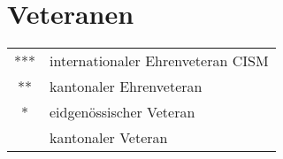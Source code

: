 \begin{history}
    \unvbox\mitgliederbox
\end{history}

\chapter{Veteranen}
\begin{history}
    \unvbox\veteranenbox
\end{history}

\begin{tabular}{ c l  }
    *** & internationaler Ehrenveteran CISM \\
    **  & kantonaler Ehrenveteran           \\
    *   & eidgenössischer Veteran           \\
        & kantonaler Veteran                \\
\end{tabular}